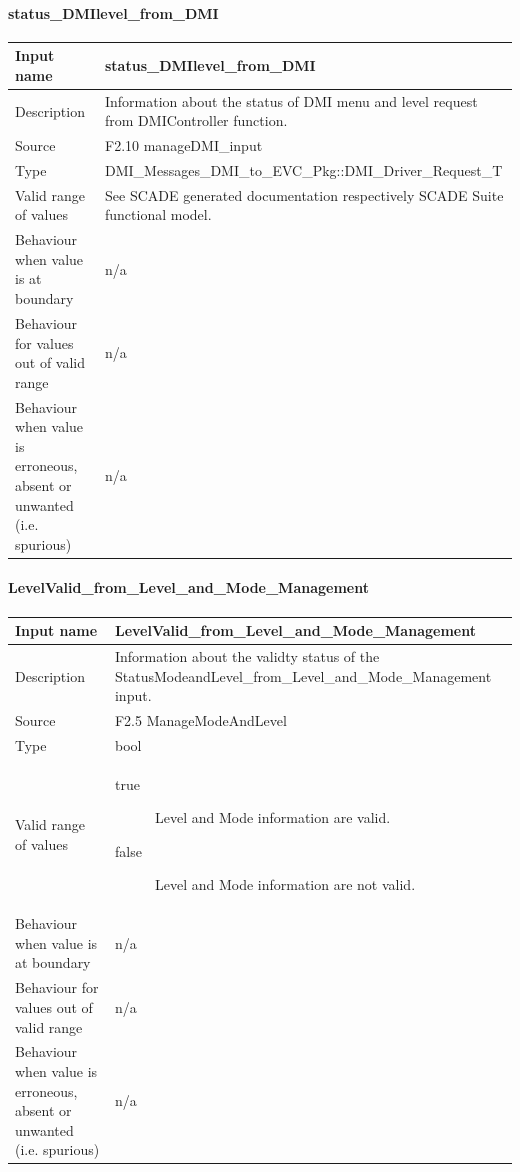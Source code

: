 \paragraph{status\_DMIlevel\_from\_DMI}

\begin{longtable}{p{}p{}}
\toprule
Input name				& status\_DMIlevel\_from\_DMI  \\
\midrule
Description				& Information about the status of DMI menu and level request from DMIController function. \\
\midrule
Source					& F2.10 manageDMI\_input\\ 
\midrule
Type					& DMI\_Messages\_DMI\_to\_EVC\_Pkg::DMI\_Driver\_Request\_T \\
\midrule
Valid range of values	& See SCADE generated documentation respectively SCADE Suite functional model. \\
\midrule
Behaviour when value is at boundary	& n/a \\
\midrule
Behaviour for values out of valid range	& n/a \\
\midrule
Behaviour when value is erroneous, absent or unwanted (i.e. spurious) & n/a \\
\bottomrule
\end{longtable}

\paragraph{LevelValid\_from\_Level\_and\_Mode\_Management}

\begin{longtable}{p{}p{}}
\toprule
Input name				& LevelValid\_from\_Level\_and\_Mode\_Management  \\
\midrule
Description				& Information about the validty status of  the StatusModeandLevel\_from\_Level\_and\_Mode\_Management input. \\
\midrule
Source					& F2.5 ManageModeAndLevel \\
\midrule
Type					& bool \\
\midrule
Valid range of values	& \begin{description}
\item[true]Level and Mode information are valid.
\item[false]Level and Mode information are not valid.
\end{description} \\
\midrule
Behaviour when value is at boundary	& n/a \\
\midrule
Behaviour for values out of valid range	& n/a\\
\midrule
Behaviour when value is erroneous, absent or unwanted (i.e. spurious) & n/a \\
\bottomrule
\end{longtable}

